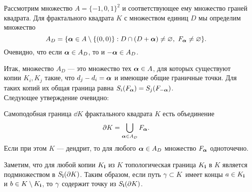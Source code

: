 Рассмотрим множество $A=\{-1,0,1\}^2$ и соответствующее ему множество граней квадрата. 
Для фрактального квадрата $K$ с множеством единиц $D$ мы определим множество 
$$A_D=\{{\bm{\alpha}}\in A\setminus\{(0,0)\}: D\cap(D+{\bm{\alpha}})\neq\varnothing,\ F_{\bm{\alpha}}\neq\varnothing\}.$$ 
Очевидно, что если ${\bm{\alpha}}\in A_D$, то и $-{\bm{\alpha}}\in A_D$.

Итак, множество $A_D$ --- это множество тех ${\bm{\alpha}}\in A$, для которых существуют копии $K_i, K_j$ такие, что $d_j-d_i={\bm{\alpha}}$ и имеющие общие граничные точки. 
Для таких копий их общая граница равна $S_i(F_{\bm{\alpha}})=S_j(F_{-{\bm{\alpha}}})$.\\

Следующее утверждение очевидно:

\begin{proposition}\label{prop:dd}
Самоподобная граница $\dd K$ фрактального квадрата $K$ есть объединение
$$\partial K=\bigcup\limits_{{\bm{\alpha}}\in A_D}F_{\bm{\alpha}}.$$
Если при этом $K$ --- дендрит, то для любого ${\bm{\alpha}}\in A_D$ множество $F_{\bm{\alpha}}$ одноточечно.
\end{proposition}

Заметим, что для любой копии $K_{\bf{i}}$ из $K$ топологическая граница $K_{\bf{i}}$ в $K$ является подмножеством в 
$S_{\bf{i}}(\partial K)$. 
Таким образом, если путь $\gamma\subset K$ имеет концы $a\in K_{\bf{i}}$ и $b\in K\setminus K_{\bf{i}}$, то $\gamma$ содержит точку из $S_{\bf{i}}(\partial K)$.

